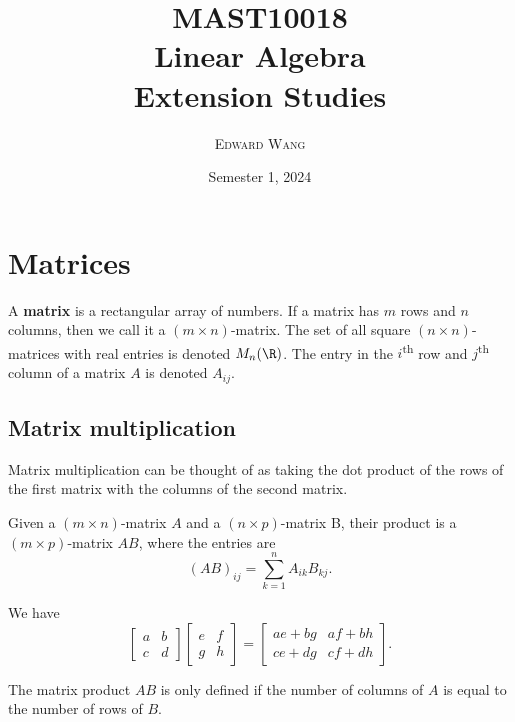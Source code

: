 \documentclass[a4paper]{article}
\title{\bfseries MAST10018 \\ Linear Algebra \\ Extension Studies}
\author{\scshape Edward Wang}
\date{Semester 1, 2024}
\begin{document}
\maketitle
\tableofcontents
\clearpage
\section{Matrices}
A \textbf{matrix} is a rectangular array of numbers. If a matrix has $m$ rows and $n$ columns, then we call it a $(m\times n)$-matrix. The set of all square $(n\times n)$-matrices with real entries is denoted $M_{n}(\R)$. The entry in the $i$\textsuperscript{th} row and $j$\textsuperscript{th} column of a matrix $A$ is denoted $A_{ij}$.
\subsection{Matrix multiplication}
Matrix multiplication can be thought of as taking the dot product of the rows of the first matrix with the columns of the second matrix.
\begin{definition}
  Given a $(m\times n)$-matrix $A$ and a $(n\times p)$-matrix B, their product is a $(m\times p)$-matrix $AB$, where the entries are \[
    (AB)_{ij} = \sum_{k=1}^{n} A_{ik}B_{kj}
  .\] 
\end{definition}
\begin{example}
  We have 
  \begin{equation*}
    \begin{bmatrix}
      a & b \\ c & d
    \end{bmatrix}
    \begin{bmatrix}
      e & f \\ g & h
    \end{bmatrix}
    = 
    \begin{bmatrix}
      ae + bg & af + bh \\ ce + dg & cf + dh
    \end{bmatrix}.
  \end{equation*}
\end{example}
\begin{remark}
  The matrix product $AB$ is only defined if the number of columns of $A$ is equal to the number of rows of $B$.
\end{remark}
\end{document}
